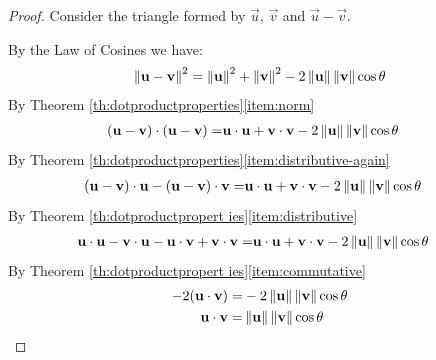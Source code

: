 \documentclass{ximera}
\begin{document}
\begin{proof} Consider the triangle formed by $\vec{u}$, $\vec{v}$ and $\vec{u}-\vec{v}$. 

\begin{image}[2in]
\end{image}

By the Law of Cosines we have:
\begin{align*}
\left\lVert\mathbf{u}-\mathbf{v}\right\rVert^2=\left\lVert\mathbf{u}\right\rVert^2+\left\lVert\mathbf{v}\right\rVert^2-2\left\lVert\mathbf{u}\right\rVert\left\lVert\mathbf{v}\right\rVert\cos\theta
\end{align*}
By Theorem \ref{th:dotproductproperties}\ref{item:norm}
\begin{align*}
(\mathbf{u}-\mathbf{v})\cdot (\mathbf{u}-\mathbf{v})=&\mathbf{u}\cdot \mathbf{u}+\mathbf{v}\cdot \mathbf{v}-2\left\lVert\mathbf{u}\right\rVert\left\lVert\mathbf{v}\right\rVert\cos\theta
\end{align*}
By Theorem \ref{th:dotproductproperties}\ref{item:distributive-again}
\begin{align*}
(\mathbf{u}-\mathbf{v})\cdot \mathbf{u}-(\mathbf{u}-\mathbf{v})\cdot \mathbf{v}=&\mathbf{u}\cdot \mathbf{u}+\mathbf{v}\cdot \mathbf{v}-2\left\lVert\mathbf{u}\right\rVert\left\lVert\mathbf{v}\right\rVert\cos\theta
\end{align*}
By Theorem \ref{th:dotproductpropert ies}\ref{item:distributive}
\begin{align*}
\mathbf{u}\cdot \mathbf{u}-\mathbf{v}\cdot\mathbf{u}-\mathbf{u}\cdot\mathbf{v}+\mathbf{v}\cdot \mathbf{v}=&\mathbf{u}\cdot \mathbf{u}+\mathbf{v}\cdot \mathbf{v}-2\left\lVert\mathbf{u}\right\rVert\left\lVert\mathbf{v}\right\rVert\cos\theta
\end{align*}
By Theorem \ref{th:dotproductpropert ies}\ref{item:commutative}
\begin{align*}
-2(\mathbf{u}\cdot \mathbf{v})=&-2\left\lVert\mathbf{u}\right\rVert\left\lVert\mathbf{v}\right\rVert\cos\theta\\
\mathbf{u}\cdot \mathbf{v}=&\left\lVert\mathbf{u}\right\rVert\left\lVert\mathbf{v}\right\rVert\cos\theta
\end{align*}
\end{proof}
\end{document}

